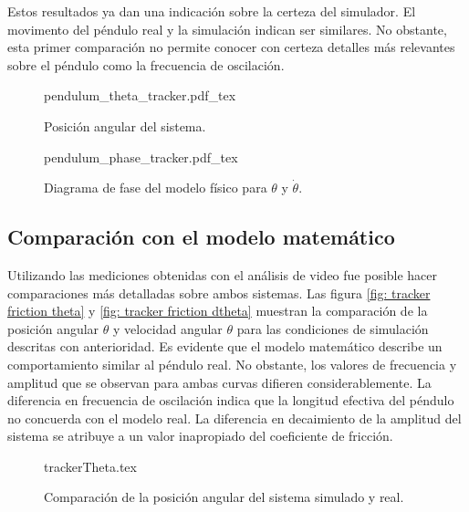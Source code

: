 Estos resultados ya dan una indicación sobre la certeza del simulador.
El movimento del péndulo real y la simulación indican ser similares.
No obstante, esta primer comparación no permite conocer con certeza 
detalles más relevantes sobre el péndulo como la frecuencia de oscilación.

\begin{figure}[htb!]
 \centering
{pendulum_theta_tracker.pdf_tex}
 \caption{Posición angular del sistema.}
 \label{fig: tracker theta}
\end{figure}



\begin{figure}[htb!]
\centering
{pendulum_phase_tracker.pdf_tex}
\caption{Diagrama de fase del modelo físico para $\theta$ y $\dot \theta$.}
\label{fig: tracker phase diagram theta dtheta}
\end{figure}

\pagebreak

\subsection{Comparación con el modelo matemático}
Utilizando las mediciones obtenidas con el análisis de video fue posible hacer 
comparaciones más detalladas sobre ambos sistemas.
Las figura \ref{fig: tracker friction theta} y \ref{fig: tracker friction dtheta}
muestran la comparación de la posición angular $\theta$ 
y velocidad angular $\theta$ para las condiciones de simulación descritas
con anterioridad.
Es evidente que el modelo matemático describe un comportamiento similar al 
péndulo real.
No obstante, los valores de frecuencia y amplitud que se observan para ambas curvas
difieren considerablemente.
La diferencia en frecuencia de oscilación indica que la longitud efectiva 
del péndulo no concuerda con el modelo real.
La diferencia en decaimiento de la amplitud del sistema se atribuye a un valor 
inapropiado del coeficiente de fricción.

\begin{figure}[htb!]
 \centering
{trackerTheta.tex}
 \caption{Comparación de la posición angular del sistema simulado y real.}
 \label{fig: time tracker theta}
\end{figure}

